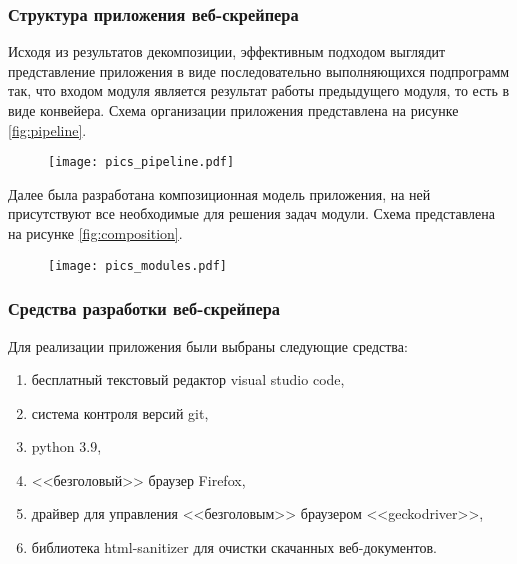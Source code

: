 \documentclass[../main]{subfiles}
\begin{document}
\subsubsection{Структура приложения веб-скрейпера}
Исходя из результатов декомпозиции, эффективным подходом выглядит представление приложения в виде последовательно выполняющихся подпрограмм так, что входом модуля является результат работы предыдуще\-го модуля, то есть в виде конвейера. Схема организации приложения предста\-влена на рисунке \ref{fig:pipeline}.

\begin{figure}[H]
    \centering
    {\texttt{[image: pics\_pipeline.pdf]}}
    \vspace{-\baselineskip}
\end{figure}

Далее была разработана композиционная модель приложения, на ней присутствуют все необходимые для решения задач модули. Схема представлена на рисунке \ref{fig:composition}.

\begin{figure}[H]
    \centering
    {\texttt{[image: pics\_modules.pdf]}}
    \vspace{-\baselineskip}
\end{figure}


\subsubsection{Средства разработки веб-скрейпера}
Для реализации приложения были выбраны следующие средства:
\begin{enumerate}
    \item бесплатный текстовый редактор visual studio code,
    \item система контроля версий git,
    \item python 3.9,
    \item <<безголовый>> браузер Firefox,
    \item драйвер для управления <<безголовым>> браузером <<geckodriver>>,
    \item библиотека html-sanitizer для очистки скачанных веб-документов. 
\end{enumerate}
\end{document}
